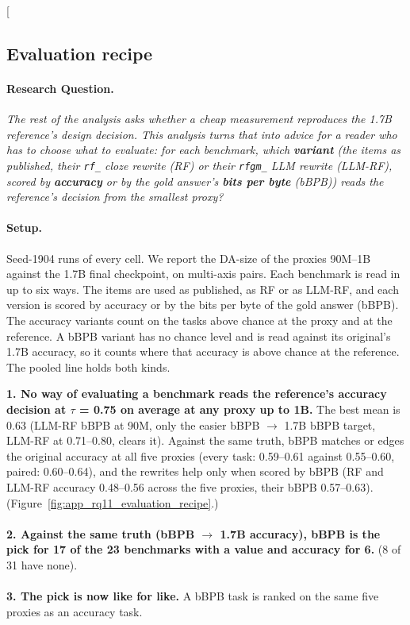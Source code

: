 \clearpage
\twocolumn[{%
\subsection{Evaluation recipe}
\label{app:rq11_evaluation_recipe}

\noindent\begin{minipage}[t]{0.485\textwidth}
\vspace{0pt}
\paragraph{Research Question.} \emph{The rest of the analysis asks whether a cheap measurement reproduces the 1.7B reference's design decision. This analysis turns that into advice for a reader who has to choose what to evaluate: for each benchmark, which \textbf{variant} (the items as published, their \texttt{rf\_} cloze rewrite (RF) or their \texttt{rfgm\_} LLM rewrite (LLM-RF), scored by \textbf{accuracy} or by the gold answer's \textbf{bits per byte} (bBPB)) reads the reference's decision from the smallest proxy?}

\paragraph{Setup.} Seed-1904 runs of every cell. We report the DA-size of the proxies 90M--1B against the 1.7B final checkpoint, on multi-axis pairs. Each benchmark is read in up to six ways. The items are used as published, as RF or as LLM-RF, and each version is scored by accuracy or by the bits per byte of the gold answer (bBPB). The accuracy variants count on the tasks above chance at the proxy and at the reference. A bBPB variant has no chance level and is read against its original's 1.7B accuracy, so it counts where that accuracy is above chance at the reference. The pooled line holds both kinds.
\end{minipage}\hfill
\begin{minipage}[t]{0.485\textwidth}
\vspace{0pt}
\begin{rqfinding}
\textbf{1. No way of evaluating a benchmark reads the reference's accuracy decision at $\tau$ = 0.75 on average at any proxy up to 1B.} The best mean is 0.63 (LLM-RF bBPB at 90M, only the easier bBPB $\rightarrow$ 1.7B bBPB target, LLM-RF at 0.71--0.80, clears it). Against the same truth, bBPB matches or edges the original accuracy at all five proxies (every task: 0.59--0.61 against 0.55--0.60, paired: 0.60--0.64), and the rewrites help only when scored by bBPB (RF and LLM-RF accuracy 0.48--0.56 across the five proxies, their bBPB 0.57--0.63). (Figure~\ref{fig:app_rq11_evaluation_recipe}.)
\\
\\
\textbf{2. Against the same truth (bBPB $\rightarrow$ 1.7B accuracy), bBPB is the pick for 17 of the 23 benchmarks with a value and accuracy for 6.} (8 of 31 have none).
\\
\\
\textbf{3. The pick is now like for like.} A bBPB task is ranked on the same five proxies as an accuracy task.
\end{rqfinding}
\end{minipage}

}
